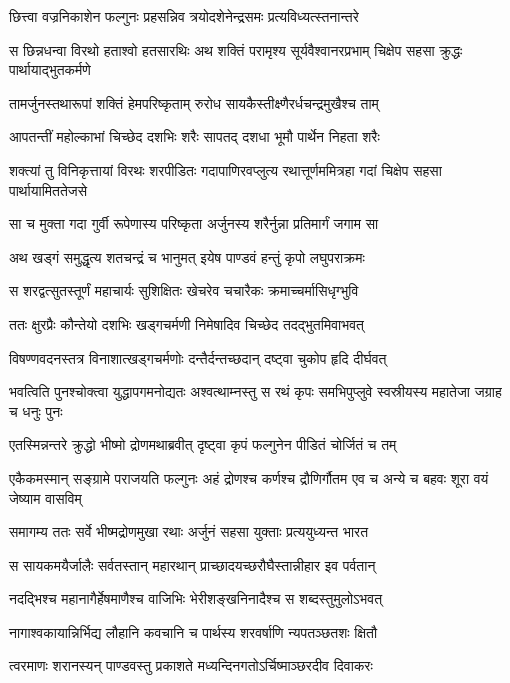 \twolineshloka
{छित्त्वा वज्रनिकाशेन फल्गुनः प्रहसन्निव}
{त्रयोदशेनेन्द्रसमः प्रत्यविध्यत्स्तनान्तरे}


\threelineshloka
{स छिन्नधन्वा विरथो हताश्वो हतसारथिः}
{अथ शक्तिं परामृश्य सूर्यवैश्वानरप्रभाम्}
{चिक्षेप सहसा क्रुद्धः पार्थायाद्भुतकर्मणे}


\twolineshloka
{तामर्जुनस्तथारूपां शक्तिं हेमपरिष्कृताम्}
{रुरोध सायकैस्तीक्ष्णैरर्धचन्द्रमुखैश्च ताम्}


\twolineshloka
{आपतन्तीं महोल्काभां चिच्छेद दशभिः शरैः}
{सापतद् दशधा भूमौ पार्थेन निहता शरैः}


\threelineshloka
{शक्त्यां तु विनिकृत्तायां विरथः शरपीडितः}
{गदापाणिरवप्लुत्य रथात्तूर्णममित्रहा}
{गदां चिक्षेप सहसा पार्थायामिततेजसे}


\twolineshloka
{सा च मुक्ता गदा गुर्वी रूपेणास्य परिष्कृता}
{अर्जुनस्य शरैर्नुन्ना प्रतिमार्गं जगाम सा}


\twolineshloka
{अथ खड्गं समुद्धृत्य शतचन्द्रं च भानुमत्}
{इयेष पाण्डवं हन्तुं कृपो लघुपराक्रमः}


\twolineshloka
{स शरद्वत्सुतस्तूर्णं महाचार्यः सुशिक्षितः}
{खेचरेव चचारैकः क्रमाच्चर्मासिधृग्भुवि}


\twolineshloka
{ततः क्षुरप्रैः कौन्तेयो दशभिः खड्गचर्मणी}
{निमेषादिव चिच्छेद तदद्भुतमिवाभवत्}


\twolineshloka
{विषण्णवदनस्तत्र विनाशात्खड्गचर्मणोः}
{दन्तैर्दन्तच्छदान् दष्ट्वा चुकोप हृदि दीर्घवत्}


\threelineshloka
{भवत्विति पुनश्चोक्त्वा युद्धापगमनोद्यतः}
{अश्वत्थाम्नस्तु स रथं कृपः समभिपुप्लुवे}
{स्वस्रीयस्य महातेजा जग्राह च धनुः पुनः}


\twolineshloka
{एतस्मिन्नन्तरे क्रुद्धो भीष्मो द्रोणमथाब्रवीत्}
{दृष्ट्वा कृपं फल्गुनेन पीडितं चोर्जितं च तम्}


\threelineshloka
{एकैकमस्मान् सङ्ग्रामे पराजयति फल्गुनः}
{अहं द्रोणश्च कर्णश्च द्रौणिर्गौतम एव च}
{अन्ये च बहवः शूरा वयं जेष्याम वासविम्}


\twolineshloka
{समागम्य ततः सर्वे भीष्मद्रोणमुखा रथाः}
{अर्जुनं सहसा युक्ताः प्रत्ययुध्यन्त भारत}


\twolineshloka
{स सायकमयैर्जालैः सर्वतस्तान् महारथान्}
{प्राच्छादयच्छरौघैस्तान्नीहार इव पर्वतान्}


\twolineshloka
{नदद्भिश्च महानागैर्हेषमाणैश्च वाजिभिः}
{भेरीशङ्खनिनादैश्च स शब्दस्तुमुलोऽभवत्}


\twolineshloka
{नागाश्वकायान्निर्भिद्य लौहानि कवचानि च}
{पार्थस्य शरवर्षाणि न्यपतञ्छतशः क्षितौ}


\twolineshloka
{त्वरमाणः शरानस्यन् पाण्डवस्तु प्रकाशते}
{मध्यन्दिनगतोऽर्चिष्माञ्छरदीव दिवाकरः}


